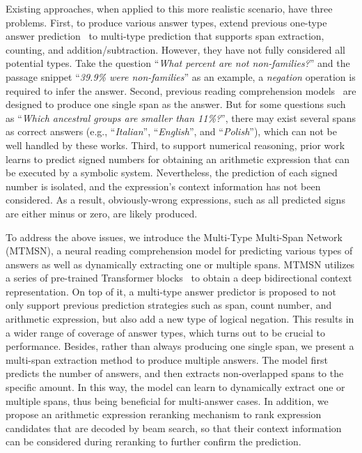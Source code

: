 \documentclass[11pt,a4paper]{article}
\begin{document}
Existing approaches, when applied to this more realistic scenario, have three problems.
First, to produce various answer types, \citet{dua2019drop} extend previous one-type answer prediction~\cite{seo2016bidirectional} to multi-type prediction that supports span extraction, counting, and addition/subtraction.
However, they have not fully considered all potential types. 
Take the question ``\emph{What percent are not non-families?}'' and the passage snippet ``\emph{39.9\% were non-families}'' as an example, a \emph{negation} operation is required to infer the answer.
Second, previous reading comprehension models~\cite{wang2017gated,yu2018fast,hu2017reinforced} are designed to produce one single span as the answer. 
But for some questions such as ``\emph{Which ancestral groups are smaller than 11\%?}'', there may exist several spans as correct answers (e.g., ``\emph{Italian}'', ``\emph{English}'', and ``\emph{Polish}''), which can not be well handled by these works.
Third, to support numerical reasoning, prior work~\cite{dua2019drop} learns to predict signed numbers for obtaining an arithmetic expression that can be executed by a symbolic system. 
Nevertheless, the prediction of each signed number is isolated, and the expression's context information has not been considered. As a result, obviously-wrong expressions, such as all predicted signs are either minus or zero, are likely produced.

To address the above issues, we introduce the Multi-Type Multi-Span Network (MTMSN), a neural reading comprehension model for predicting various types of answers as well as dynamically extracting one or multiple spans. 
MTMSN utilizes a series of pre-trained Transformer blocks~\cite{devlin2018bert} to obtain a deep bidirectional context representation.
On top of it, a multi-type answer predictor is proposed to not only support previous prediction strategies such as span, count number, and arithmetic expression, but also add a new type of logical negation.
This results in a wider range of coverage of answer types, which turns out to be crucial to performance.
Besides, rather than always producing one single span, we present a multi-span extraction method to produce multiple answers. 
The model first predicts the number of answers, and then extracts non-overlapped spans to the specific amount.
In this way, the model can learn to dynamically extract one or multiple spans, thus being beneficial for multi-answer cases.
In addition, we propose an arithmetic expression reranking mechanism to rank expression candidates that are decoded by beam search, so that their context information can be considered during reranking to further confirm the prediction.
\end{document}
